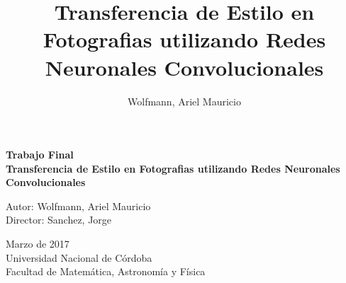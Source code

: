 \documentclass[a4paper,11pt,spanish]{book}
\title{Transferencia de Estilo en Fotografias utilizando Redes Neuronales Convolucionales}   %
\author{Wolfmann, Ariel Mauricio}             %
\begin{document}



\begin{titlepage}
  \begin{center}
  \vspace*{1in}
    \begin{Huge}
    \textbf{Trabajo Final}\\
    \textbf{Transferencia de Estilo en Fotografias utilizando Redes Neuronales Convolucionales} \\
    \end{Huge}
  \end{center}
  \begin{center}
    \begin{large}
      \vspace*{1in}
      Autor: Wolfmann, Ariel Mauricio\\
      Director: Sanchez, Jorge\\
    \end{large}
    \vspace*{0.15in}
     Marzo de 2017\\
    \vspace*{0.15in}
    Universidad Nacional de Córdoba\\
    \vspace*{0.15in}
    Facultad de Matemática, Astronomía y Física\\
    \vspace*{0.6in}
  \end{center}
\end{titlepage}

\end{document}
